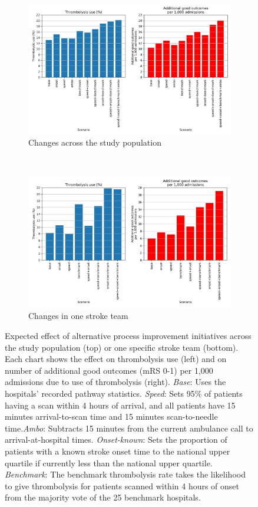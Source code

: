 \begin{figure}[h]
    \centering
    \begin{subfigure}[b]{1\textwidth}
        \centering
        \includegraphics[width=0.8\linewidth]{images/sim_results_summary}
        \caption{Changes across the study population}
        \label{fig:scenarios_population}
    \end{subfigure}
    \\
    \vspace{8mm}
    \begin{subfigure}[b]{1\textwidth}
        \centering
    \includegraphics[width=0.8\linewidth]{images/sim_results_team_x}
        \caption{Changes in one stroke team}
        \label{fig:scenarios_team}
    \end{subfigure}
    \caption{Expected effect of alternative process improvement initiatives across the study population (top) or one specific stroke team (bottom). Each chart shows the effect on thrombolysis use (left) and on number of additional good outcomes (mRS 0-1) per 1,000 admissions due to use of thrombolysis (right). \textit{Base}: Uses the hospitals’ recorded pathway statistics. \textit{Speed}: Sets 95\% of patients having a scan within 4 hours of arrival, and all patients have 15 minutes arrival-to-scan time and 15 minutes scan-to-needle time.\textit{Ambo}: Subtracts 15 minutes from the current ambulance call to arrival-at-hospital times. \textit{Onset-known}: Sets the proportion of patients with a known stroke onset time to the national upper quartile if currently less than the national upper quartile. \textit{Benchmark}: The benchmark thrombolysis rate takes the likelihood to give thrombolysis for patients scanned within 4 hours of onset from the majority vote of the 25 benchmark hospitals.}
    \label{fig:sim_results_summary}
\end{figure}


